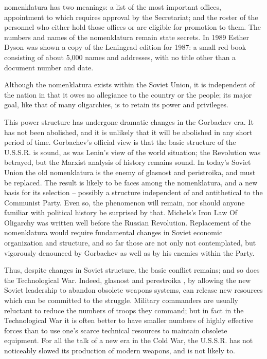 \documentclass[a4paper,12pt]{book}
\begin{document}
nomenklatura has two meanings: a list of the most important offices, appointment to which requires approval by the Secretariat; and the roster of the personnel who either hold those offices or are eligible for promotion to them. The numbers and names of the nomenklatura remain state secrets. In 1989 Esther Dyson was shown a copy of the Leningrad edition for 1987: a small red book consisting of about 5,000 names and addresses, with no title other than a document number and date.

Although the nomenklatura exists within the Soviet Union, it is independent of the nation in that it owes no allegiance to the country or the people; its major goal, like that of many oligarchies, is to retain its power and privileges.

This power structure has undergone dramatic changes in the Gorbachev era. It has not been abolished, and it is unlikely that it will be abolished in any short period of time. Gorbachev's official view is that the basic structure of the U.S.S.R. is sound, as was Lenin's view of the world situation; the Revolution was betrayed, but the Marxist analysis of history remains sound. In today's Soviet Union the old nomenklatura is the enemy of glasnost and peristroika, and must be replaced. The result is likely to be faces among the nomenklatura, and a new basis for its selection -- possibly a structure independent of and antithetical to the Communist Party. Even so, the phenomenon will remain, nor should anyone familiar with political history be surprised by that. Michels's Iron Law Of Oligarchy was written well before the Russian Revolution. Replacement of the nomenklatura would require fundamental changes in Soviet economic organization and structure, and so far those are not only not contemplated, but vigorously denounced by Gorbachev as well as by his enemies within the Party.

Thus, despite changes in Soviet structure, the basic conflict remains; and so does the Technological War. Indeed, glasnost and perestroika , by allowing the new Soviet leadership to abandon obsolete weapons systems, can release new resources which can be committed to the struggle. Military commanders are usually reluctant to reduce the numbers of troops they command; but in fact in the Technological War it is often better to have smaller numbers of highly effective forces than to use one's scarce technical resources to maintain obsolete equipment. For all the talk of a new era in the Cold War, the U.S.S.R. has not noticeably slowed its production of modern weapons, and is not likely to.
\end{document}
